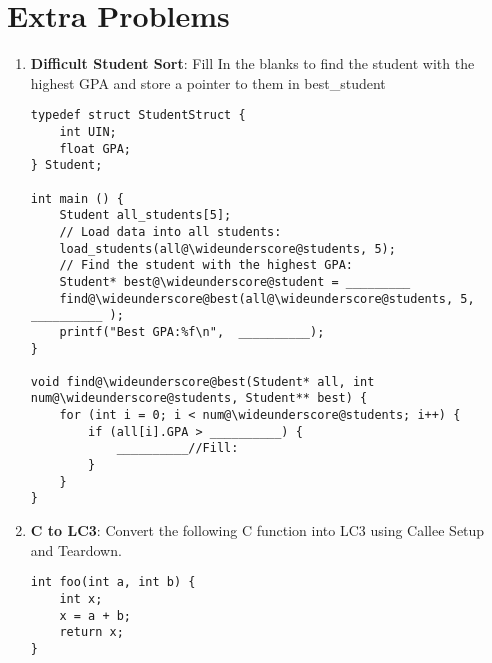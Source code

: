\documentclass{article}
\begin{document}
\section{Extra Problems}
\begin{enumerate}[label=(\alph*),itemsep = 120pt]
\item \textbf{Difficult Student Sort}: Fill In the blanks to find the student with the highest GPA and store a pointer to them in best\_student
\begin{lstlisting}[style=CStyle] 
typedef struct StudentStruct {
    int UIN;
    float GPA;
} Student;

int main () {
    Student all_students[5];
    // Load data into all students:
    load_students(all@\wideunderscore@students, 5);
    // Find the student with the highest GPA:
    Student* best@\wideunderscore@student = _________
    find@\wideunderscore@best(all@\wideunderscore@students, 5, __________ );
    printf("Best GPA:%f\n",  __________);
}

void find@\wideunderscore@best(Student* all, int num@\wideunderscore@students, Student** best) {
    for (int i = 0; i < num@\wideunderscore@students; i++) {
        if (all[i].GPA > __________) {
            __________//Fill:
        }
    }
}

\end{lstlisting}
 \item \textbf{C to LC3}: Convert the following C function into LC3 using Callee Setup and Teardown.
    \begin{lstlisting}[style=CStyle] 
int foo(int a, int b) {
    int x;
    x = a + b;
    return x;
}\end{lstlisting}

\end{enumerate}
\end{document}
